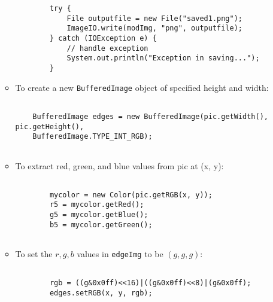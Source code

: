 \documentclass{article}
\begin{document}
\begin{itemize}
\begin{itemize}
                    \begin{verbatim}
        try {
            File outputfile = new File("saved1.png");
            ImageIO.write(modImg, "png", outputfile);
        } catch (IOException e) {
            // handle exception
            System.out.println("Exception in saving...");
        }
\end{verbatim}

              \item To create a new \texttt{BufferedImage} object of specified height and width:

                    \begin{verbatim}
        
    BufferedImage edges = new BufferedImage(pic.getWidth(), pic.getHeight(),
    BufferedImage.TYPE_INT_RGB);
    
\end{verbatim}

              \item To extract red, green, and blue values from pic at (x, y):

                    \begin{verbatim}
            
        mycolor = new Color(pic.getRGB(x, y));
        r5 = mycolor.getRed();
        g5 = mycolor.getBlue();
        b5 = mycolor.getGreen();
        
\end{verbatim}

              \item To set the $r, g, b$ values in \texttt{edgeImg} to be $(g, g, g)$:

                    \begin{verbatim}

        rgb = ((g&0x0ff)<<16)|((g&0x0ff)<<8)|(g&0x0ff);
        edges.setRGB(x, y, rgb);
        
\end{verbatim}





          \end{itemize}





\end{itemize}
\end{document}

